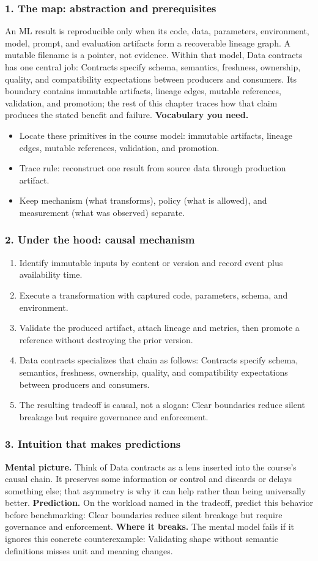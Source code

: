 \subsubsection*{1. The map: abstraction and prerequisites}
An ML result is reproducible only when its code, data, parameters, environment, model, prompt, and evaluation artifacts form a recoverable lineage graph. A mutable filename is a pointer, not evidence.
Within that model, Data contracts has one central job: Contracts specify schema, semantics, freshness, ownership, quality, and compatibility expectations between producers and consumers. Its boundary contains immutable artifacts, lineage edges, mutable references, validation, and promotion; the rest of this chapter traces how that claim produces the stated benefit and failure.
\textbf{Vocabulary you need.}\begin{itemize}
\item Locate these primitives in the course model: immutable artifacts, lineage edges, mutable references, validation, and promotion.
\item Trace rule: reconstruct one result from source data through production artifact.
\item Keep mechanism (what transforms), policy (what is allowed), and measurement (what was observed) separate.
\end{itemize}
\subsubsection*{2. Under the hood: causal mechanism}\begin{enumerate}
\item Identify immutable inputs by content or version and record event plus availability time.
\item Execute a transformation with captured code, parameters, schema, and environment.
\item Validate the produced artifact, attach lineage and metrics, then promote a reference without destroying the prior version.
\item Data contracts specializes that chain as follows: Contracts specify schema, semantics, freshness, ownership, quality, and compatibility expectations between producers and consumers.
\item The resulting tradeoff is causal, not a slogan: Clear boundaries reduce silent breakage but require governance and enforcement.
\end{enumerate}
\subsubsection*{3. Intuition that makes predictions}
\textbf{Mental picture.} Think of Data contracts as a lens inserted into the course's causal chain. It preserves some information or control and discards or delays something else; that asymmetry is why it can help rather than being universally better.
\textbf{Prediction.} On the workload named in the tradeoff, predict this behavior before benchmarking: Clear boundaries reduce silent breakage but require governance and enforcement.
\textbf{Where it breaks.} The mental model fails if it ignores this concrete counterexample: Validating shape without semantic definitions misses unit and meaning changes.
